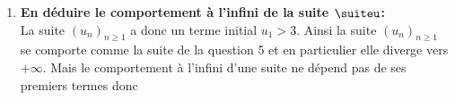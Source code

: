 \documentclass[a4paper, 11pt]{article}
\begin{document}
\begin{correction}
\begin{enumerate}
\begin{enumerate}
\item \textbf{En d\'eduire le comportement \`{a} l'infini de la suite $\suiteu$:}\\
\noindent La suite $(u_n)_{n\geq 1}$ a donc un terme initial $u_1>3$. Ainsi la suite $(u_n)_{n\geq 1}$ se comporte comme la suite de la question 5 et en particulier elle diverge vers $+\infty$. Mais le comportement \`{a} l'infini d'une suite ne d\'epend pas de ses premiers termes donc 
\end{enumerate} 
\end{enumerate}
\end{correction}



\end{document}
